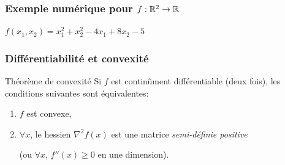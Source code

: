 \documentclass{beamer}
\newcommand{\R}{{\ensuremath\mathbb{R}}}
\begin{document}
\begin{frame}
  \frametitle{Exemple numérique pour $f:\R^2 \rightarrow \R$}

  \begin{block}{$f(x_1,x_2) = x_1^2 + x_2^2 - 4x_1 + 8x_2 - 5$}
  \end{block}
\end{frame}

\begin{frame}
  \frametitle{Différentiabilité et convexité}

  \begin{block}{Théorème de convexité}
    Si $f$ est continûment différentiable (deux fois), les conditions suivantes sont équivalentes:
    \begin{enumerate}
    \item $f$ est convexe,
    \item $\forall x$, le hessien $\nabla^2f(x)$ est une matrice \emph{semi-définie positive}

      (ou $\forall x$, $f''(x) \geq 0$ en une dimension).
    \end{enumerate}
  \end{block}

\end{frame}
\end{document}
